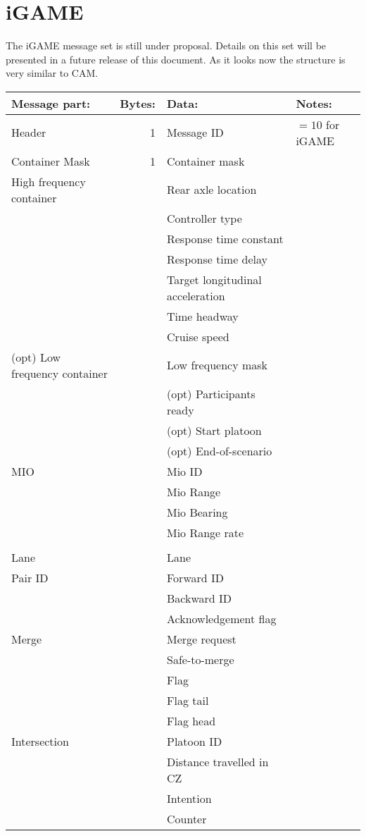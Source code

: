 \documentclass[11pt]{article}
\begin{document}
\newpage

\section{iGAME}
\label{sec:orgheadline5}
The iGAME message set is still under proposal. Details on this set
will be presented in a future release of this document. As it looks
now the structure is very similar to CAM.


\begin{center}
\begin{tabular}{lrll}
Message part: & Bytes: & Data: & Notes:\\
\hline
Header & 1 & Message ID & \(=10\) for iGAME\\
\hline
Container Mask & 1 & Container mask & \\
\hline
High frequency container &  & Rear axle location & \\
 &  & Controller type & \\
 &  & Response time constant & \\
 &  & Response time delay & \\
 &  & Target longitudinal acceleration & \\
 &  & Time headway & \\
 &  & Cruise speed & \\
\hline
(opt) Low frequency container &  & Low frequency mask & \\
 &  & (opt) Participants ready & \\
 &  & (opt) Start platoon & \\
 &  & (opt) End-of-scenario & \\
\hline
MIO &  & Mio ID & \\
 &  & Mio Range & \\
 &  & Mio Bearing & \\
 &  & Mio Range rate & \\
 &  &  & \\
\hline
Lane &  & Lane & \\
\hline
Pair ID &  & Forward ID & \\
 &  & Backward ID & \\
 &  & Acknowledgement flag & \\
\hline
Merge &  & Merge request & \\
 &  & Safe-to-merge & \\
 &  & Flag & \\
 &  & Flag tail & \\
 &  & Flag head & \\
\hline
Intersection &  & Platoon ID & \\
 &  & Distance travelled in CZ & \\
 &  & Intention & \\
 &  & Counter & \\
\end{tabular}
\end{center}
\end{document}
